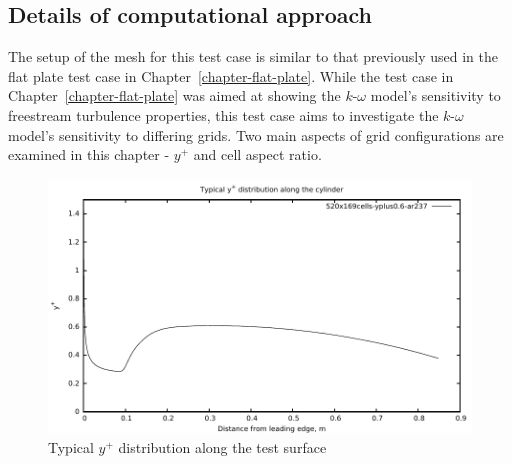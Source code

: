 \subsection{Details of computational approach}
%
The setup of the mesh for this test case is similar to that
previously used in the flat plate test case in Chapter~\ref{chapter-flat-plate}.
While the test case in Chapter~\ref{chapter-flat-plate} was aimed at
showing the $k$-$\omega$ model's sensitivity to freestream turbulence
properties, this test case aims to investigate the $k$-$\omega$ model's 
sensitivity to differing grids. Two main aspects of grid configurations
are examined in this chapter - $y^+$ and cell aspect ratio.
\begin{figure}[h]
\begin{center}
\includegraphics[width=15cm]{./chap3-mallinson-cylinder/figs/typical-yplus-distribution.pdf}
\end{center}
\caption{Typical $y^+$ distribution along the test surface}
\label{figure-cylinder-typical-yplus-dist}
\end{figure}
%
